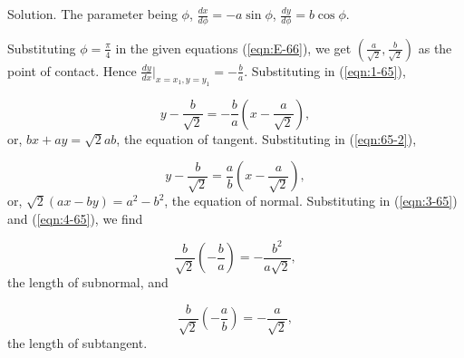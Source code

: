 \begin{example}
{Solution. 
The parameter being $\phi$, $\frac{dx}{d\phi} = - a \sin \phi$,
$\frac{dy}{d\phi} = b \cos \phi$.

Substituting $\phi = \frac{\pi}{4}$ in the given equations 
(\ref{eqn:E-66}), we get 
$\left ( \frac{a}{\sqrt{2}}, \frac{b}{\sqrt{2}} \right )$ 
as the point of contact. Hence
$\frac{dy}{dx}|_{x=x_1,y=y_1} = - \frac{b}{a}$.
Substituting in (\ref{eqn:1-65}), %

\[
y - \frac{b}{\sqrt{2}} = -\frac{b}{a} \left ( x - \frac{a}{\sqrt{2}} \right ),
\]
or, $bx + ay = \sqrt{2} ab$, the equation of tangent.
Substituting in (\ref{eqn:65-2}), %

\[
y - \frac{b}{\sqrt{2}} 	= \frac{a}{b} \left ( x - \frac{a}{\sqrt{2}} \right ),
\]
or, $\sqrt{2}(ax - by)=	a^2 - b^2$, the equation of normal.
Substituting in (\ref{eqn:3-65}) and (\ref{eqn:4-65}), %
we find

\[
\frac{b}{\sqrt{2}} \left ( -\frac{b}{a} \right ) 
= -\frac{b^2}{a\sqrt{2}}
,\]
the length of subnormal, and

\[
\frac{b}{\sqrt{2}} \left ( -\frac{a}{b} \right )
= -\frac{a}{\sqrt{2}},
\]
the length of subtangent.

}
\end{example}

